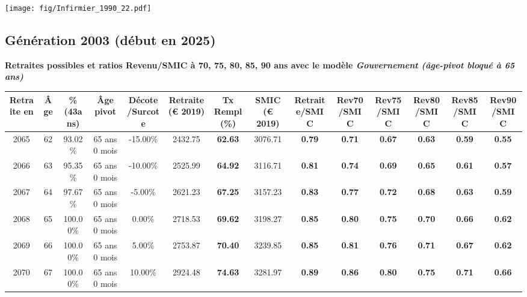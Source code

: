 \begin{center}\texttt{[image: fig/Infirmier\_1990\_22.pdf]}\end{center} \label{fig/Infirmier_1990_22.pdf} 

\newpage 
 
\subsection{Génération 2003 (début en 2025)} 

{\bf \noindent Retraites possibles et ratios Revenu/SMIC à 70, 75, 80, 85, 90 ans avec le modèle \emph{Gouvernement (âge-pivot bloqué à 65 ans)}}  
 
\begin{adjustbox}{max width=\textwidth} 
\begin{tabular}[htb]{|c|c||c|c|c||c|c||c||c|c|c|c|c|c|} 
\hline 
 Retraite en &  Âge &  \%(43ans) &  Âge pivot &  Décote/Surcote &  Retraite (\euro{} 2019) &  Tx Rempl(\%) &  SMIC (\euro{} 2019) &  Retraite/SMIC &  Rev70/SMIC &  Rev75/SMIC &  Rev80/SMIC &  Rev85/SMIC &  Rev90/SMIC \\ 
\hline \hline 
 2065 &  62 &  93.02\% &  65 ans 0 mois &  -15.00\% &  2432.75 &  {\bf 62.63} &  3076.71 &  {\bf {\color{red} 0.79}} &  {\bf {\color{red} 0.71}} &  {\bf {\color{red} 0.67}} &  {\bf {\color{red} 0.63}} &  {\bf {\color{red} 0.59}} &  {\bf {\color{red} 0.55}} \\ 
\hline 
 2066 &  63 &  95.35\% &  65 ans 0 mois &  -10.00\% &  2525.99 &  {\bf 64.92} &  3116.71 &  {\bf {\color{red} 0.81}} &  {\bf {\color{red} 0.74}} &  {\bf {\color{red} 0.69}} &  {\bf {\color{red} 0.65}} &  {\bf {\color{red} 0.61}} &  {\bf {\color{red} 0.57}} \\ 
\hline 
 2067 &  64 &  97.67\% &  65 ans 0 mois &  -5.00\% &  2621.23 &  {\bf 67.25} &  3157.23 &  {\bf {\color{red} 0.83}} &  {\bf {\color{red} 0.77}} &  {\bf {\color{red} 0.72}} &  {\bf {\color{red} 0.68}} &  {\bf {\color{red} 0.63}} &  {\bf {\color{red} 0.59}} \\ 
\hline 
 2068 &  65 &  100.00\% &  65 ans 0 mois &  0.00\% &  2718.53 &  {\bf 69.62} &  3198.27 &  {\bf {\color{red} 0.85}} &  {\bf {\color{red} 0.80}} &  {\bf {\color{red} 0.75}} &  {\bf {\color{red} 0.70}} &  {\bf {\color{red} 0.66}} &  {\bf {\color{red} 0.62}} \\ 
\hline 
 2069 &  66 &  100.00\% &  65 ans 0 mois &  5.00\% &  2753.87 &  {\bf 70.40} &  3239.85 &  {\bf {\color{red} 0.85}} &  {\bf {\color{red} 0.81}} &  {\bf {\color{red} 0.76}} &  {\bf {\color{red} 0.71}} &  {\bf {\color{red} 0.67}} &  {\bf {\color{red} 0.62}} \\ 
\hline 
 2070 &  67 &  100.00\% &  65 ans 0 mois &  10.00\% &  2924.48 &  {\bf 74.63} &  3281.97 &  {\bf {\color{red} 0.89}} &  {\bf {\color{red} 0.86}} &  {\bf {\color{red} 0.80}} &  {\bf {\color{red} 0.75}} &  {\bf {\color{red} 0.71}} &  {\bf {\color{red} 0.66}} \\ 
\hline 
\hline 
\end{tabular} 
\end{adjustbox} 
 
